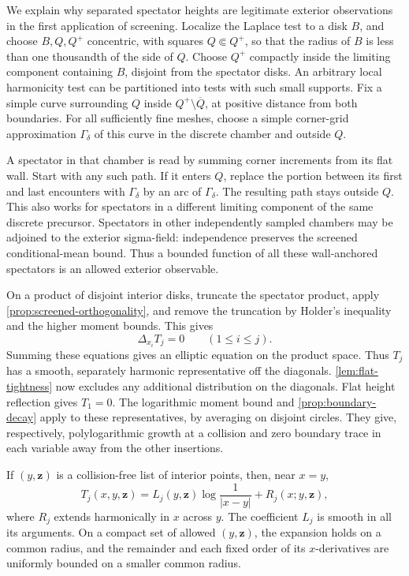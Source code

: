 We explain why separated spectator heights are legitimate exterior
observations in the first application of screening. Localize the Laplace
test to a disk \(B\), and choose \(B,Q,Q^+\) concentric, with squares
\(Q\Subset Q^+\), so that the radius of \(B\) is less than one thousandth
of the side of \(Q\).
Choose \(Q^+\) compactly inside the limiting component containing \(B\),
disjoint from the spectator disks. An arbitrary local harmonicity test can be
partitioned into tests with such small supports. Fix a simple curve surrounding \(Q\)
inside \(Q^+\setminus\overline Q\), at positive distance from both
boundaries. For all sufficiently fine meshes, choose a simple corner-grid
approximation \(\Gamma_\delta\) of this curve in the discrete chamber and
outside \(Q\).

A spectator in that chamber is read by summing corner increments from
its flat wall. Start with any such path. If it enters \(Q\), replace the
portion between its first and last encounters with \(\Gamma_\delta\) by
an arc of \(\Gamma_\delta\). The resulting path stays outside \(Q\). This
also works for spectators in a different limiting component of the same
discrete precursor. Spectators in other independently sampled chambers
may be adjoined to the exterior sigma-field: independence preserves the
screened conditional-mean bound. Thus a bounded function of all these
wall-anchored spectators is an allowed exterior observable.

On a product of disjoint interior disks, truncate the spectator product,
apply \cref{prop:screened-orthogonality}, and remove the truncation by
Holder's inequality and the higher moment bounds. This gives
\[
                     \Delta_{x_i}T_j=0\qquad(1\leq i\leq j).
\]
Summing these equations gives an elliptic equation on the product space.
Thus $T_j$ has a smooth,
separately harmonic representative off the diagonals.
\cref{lem:flat-tightness} now excludes any additional distribution on the
diagonals. Flat height
reflection gives $T_1=0$. The logarithmic moment bound and
\cref{prop:boundary-decay} apply to these representatives, by averaging
on disjoint circles. They give, respectively, polylogarithmic growth
at a collision and zero boundary trace in each variable away from the
other insertions.

\begin{lemma}
\label{lem:log-singularity}
If $(y,\mathbf z)$ is a collision-free list of interior points, then,
near $x=y$,
\begin{equation}
 T_j(x,y,\mathbf z)
   =L_j(y,\mathbf z)\log\frac1{|x-y|}
       +R_j(x;y,\mathbf z),
 \label{eq:logarithmic-expansion}
\end{equation}
where $R_j$ extends harmonically in $x$ across $y$. The coefficient
$L_j$ is smooth in all its arguments. On a compact set of allowed
$(y,\mathbf z)$, the expansion holds on a common radius, and the
remainder and each fixed order of its $x$-derivatives are uniformly
bounded on a smaller common radius.
\end{lemma}

